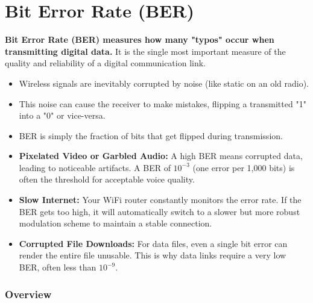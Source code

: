 
\chapter{Bit Error Rate (BER)}
\label{ch:ber}

\begin{nontechnical}
    \textbf{Bit Error Rate (BER) measures how many "typos" occur when transmitting digital data.} It is the single most important measure of the quality and reliability of a digital communication link.

    \begin{itemize}
        \item Wireless signals are inevitably corrupted by noise (like static on an old radio).
        \item This noise can cause the receiver to make mistakes, flipping a transmitted "1" into a "0" or vice-versa.
        \item BER is simply the fraction of bits that get flipped during transmission.
    \end{itemize}

    \begin{itemize}
        \item \textbf{Pixelated Video or Garbled Audio:} A high BER means corrupted data, leading to noticeable artifacts. A BER of $10^{-3}$ (one error per 1,000 bits) is often the threshold for acceptable voice quality.
        \item \textbf{Slow Internet:} Your WiFi router constantly monitors the error rate. If the BER gets too high, it will automatically switch to a slower but more robust modulation scheme to maintain a stable connection.
        \item \textbf{Corrupted File Downloads:} For data files, even a single bit error can render the entire file unusable. This is why data links require a very low BER, often less than $10^{-9}$.
    \end{itemize}
\end{nontechnical}


\subsection{Overview}

